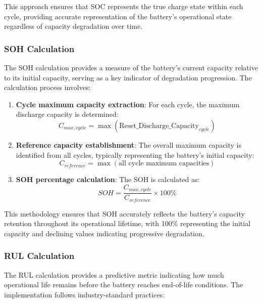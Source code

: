 This approach ensures that SOC represents the true charge state within each cycle, providing accurate representation of the battery's operational state regardless of capacity degradation over time.

\subsubsection{SOH Calculation}
\label{subsubsec:soh_calculation}

The SOH calculation provides a measure of the battery's current capacity relative to its initial capacity, serving as a key indicator of degradation progression. The calculation process involves:

\begin{enumerate}
    \item \textbf{Cycle maximum capacity extraction}: For each cycle, the maximum discharge capacity is determined:
    \begin{equation}
        C_{max,cycle} = \max(\text{Reset\_Discharge\_Capacity}_{cycle})
    \end{equation}
    
    \item \textbf{Reference capacity establishment}: The overall maximum capacity is identified from all cycles, typically representing the battery's initial capacity:
    \begin{equation}
        C_{reference} = \max(\text{all cycle maximum capacities})
    \end{equation}
    
    \item \textbf{SOH percentage calculation}: The SOH is calculated as:
    \begin{equation}
        SOH = \frac{C_{max,cycle}}{C_{reference}} \times 100\%
    \end{equation}
\end{enumerate}

This methodology ensures that SOH accurately reflects the battery's capacity retention throughout its operational lifetime, with 100\% representing the initial capacity and declining values indicating progressive degradation.

\subsubsection{RUL Calculation}
\label{subsubsec:rul_calculation}

The RUL calculation provides a predictive metric indicating how much operational life remains before the battery reaches end-of-life conditions. The implementation follows industry-standard practices:

